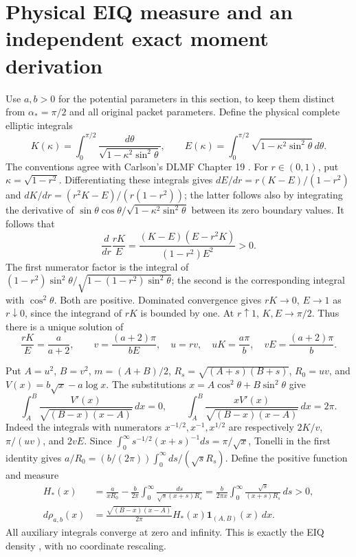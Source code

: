 \documentclass[11pt]{article}
\newcommand{\dd}{\,d}
\begin{document}
\section{Physical EIQ measure and an independent exact moment derivation}
\label{eqphysical}
Use $a,b>0$ for the potential parameters in this section, to keep them
distinct from $\alpha_*=\pi/2$ and all original packet parameters.
Define the physical complete elliptic integrals
\[
 K(\kappa)=\int_0^{\pi/2}\frac{d\theta}{\sqrt{1-\kappa^2\sin^2\theta}},
 \qquad E(\kappa)=\int_0^{\pi/2}\sqrt{1-\kappa^2\sin^2\theta}\dd\theta.
\]
The conventions agree with Carlson's DLMF Chapter 19 \cite{elliptic}.
For $r\in(0,1)$, put $\kappa=\sqrt{1-r^2}$. Differentiating these
integrals gives $dE/dr=r(K-E)/(1-r^2)$ and
$dK/dr=(r^2K-E)/(r(1-r^2))$; the latter follows also by integrating
the derivative of $\sin\theta\cos\theta/
\sqrt{1-\kappa^2\sin^2\theta}$ between its zero boundary values.
It follows that
\begin{equation}\tag{TS21}
 \frac d{dr}\frac{rK}{E}
 =\frac{(K-E)(E-r^2K)}{(1-r^2)E^2}>0.
\end{equation}
The first numerator factor is the integral of
$(1-r^2)\sin^2\theta/\sqrt{1-(1-r^2)\sin^2\theta}$;
the second is the corresponding integral with $\cos^2\theta$.
Both are positive. Dominated convergence gives $rK\to0$, $E\to1$
as $r\downarrow0$, since the integrand of $rK$ is bounded by one.
At $r\uparrow1$, $K,E\to\pi/2$. Thus there is a unique solution of
\begin{equation}\tag{TS22}
 \frac{rK}{E}=\frac a{a+2},\qquad
 v=\frac{(a+2)\pi}{bE},\quad u=rv,
 \quad uK=\frac{a\pi}{b},\quad vE=\frac{(a+2)\pi}{b}.
\end{equation}

Put $A=u^2$, $B=v^2$, $m=(A+B)/2$, $R_s=\sqrt{(A+s)(B+s)}$,
$R_0=uv$, and $V(x)=b\sqrt x-a\log x$.
The substitutions $x=A\cos^2\theta+B\sin^2\theta$ give
\[
 \int_A^B\frac{V'(x)}{\sqrt{(B-x)(x-A)}}\dd x=0,\qquad
 \int_A^B\frac{xV'(x)}{\sqrt{(B-x)(x-A)}}\dd x=2\pi.
\]
Indeed the integrals with numerators $x^{-1/2},x^{-1},x^{1/2}$
are respectively $2K/v$, $\pi/(uv)$, and $2vE$.
Since $\int_0^\infty s^{-1/2}(x+s)^{-1}ds=\pi/\sqrt x$,
Tonelli in the first identity gives
$a/R_0=(b/(2\pi))\int_0^\infty ds/(\sqrt sR_s)$.
Define the positive function and measure
\begin{equation}\tag{TS23}\begin{aligned}
 H_*(x)&=\frac{a}{xR_0}-\frac b{2\pi}\int_0^\infty
           \frac{ds}{\sqrt s(x+s)R_s}
 =\frac b{2\pi x}\int_0^\infty\frac{\sqrt s}{(x+s)R_s}\dd s>0,\\
 d\rho_{a,b}(x)&=\frac{\sqrt{(B-x)(x-A)}}{2\pi}H_*(x)
                 \mathbf1_{(A,B)}(x)\dd x.
\end{aligned}\end{equation}
All auxiliary integrals converge at zero and infinity. This is exactly
the EIQ density \cite{EIQ}, with no coordinate rescaling.
\end{document}
